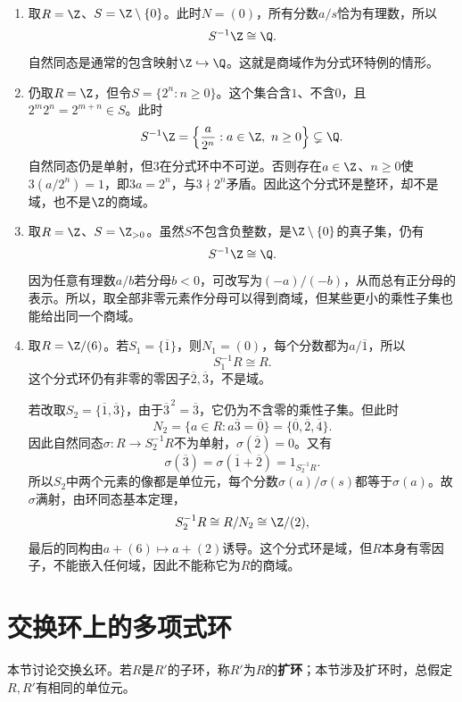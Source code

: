 \begin{example}
\begin{enumerate}
\item 取$R=\Z$、$S=\Z\setminus\{0\}$。此时$N=(0)$，所有分数$a/s$恰为有理数，所以
\[
S^{-1}\Z\cong\Q.
\]
自然同态是通常的包含映射$\Z\hookrightarrow\Q$。这就是商域作为分式环特例的情形。

\item 仍取$R=\Z$，但令$S=\{2^n:n\ge0\}$。这个集合含$1$、不含$0$，且$2^m2^n=2^{m+n}\in S$。此时
\[
S^{-1}\Z=\left\{\frac{a}{2^n}:a\in\Z,\ n\ge0\right\}\subsetneq\Q.
\]
自然同态仍是单射，但$3$在分式环中不可逆。否则存在$a\in\Z$、$n\ge0$使$3(a/2^n)=1$，即$3a=2^n$，与$3\nmid2^n$矛盾。因此这个分式环是整环，却不是域，也不是$\Z$的商域。

\item 取$R=\Z$、$S=\Z_{>0}$。虽然$S$不包含负整数，是$\Z\setminus\{0\}$的真子集，仍有
\[
S^{-1}\Z\cong\Q.
\]
因为任意有理数$a/b$若分母$b<0$，可改写为$(-a)/(-b)$，从而总有正分母的表示。所以，取全部非零元素作分母可以得到商域，但某些更小的乘性子集也能给出同一个商域。

\item 取$R=\Z/(6)$。若$S_1=\{\overline1\}$，则$N_1=(0)$，每个分数都为$a/\overline1$，所以
\[
S_1^{-1}R\cong R.
\]
这个分式环仍有非零的零因子$\overline2,\overline3$，不是域。

若改取$S_2=\{\overline1,\overline3\}$，由于$\overline3^{\,2}=\overline3$，它仍为不含零的乘性子集。但此时
\[
N_2=\{a\in R:a\overline3=\overline0\}
=\{\overline0,\overline2,\overline4\}.
\]
因此自然同态$\sigma:R\to S_2^{-1}R$不为单射，$\sigma(\overline2)=0$。又有
\[
\sigma(\overline3)=\sigma(\overline1+\overline2)=1_{S_2^{-1}R}.
\]
所以$S_2$中两个元素的像都是单位元，每个分数$\sigma(a)/\sigma(s)$都等于$\sigma(a)$。故$\sigma$满射，由环同态基本定理，
\[
S_2^{-1}R\cong R/N_2\cong\Z/(2),
\]
最后的同构由$a+(6)\mapsto a+(2)$诱导。这个分式环是域，但$R$本身有零因子，不能嵌入任何域，因此不能称它为$R$的商域。
\end{enumerate}
\end{example}

\section{交换环上的多项式环}

本节讨论交换幺环。若$R$是$R'$的子环，称$R'$为$R$的\textbf{扩环}；本节涉及扩环时，总假定$R,R'$有相同的单位元。


